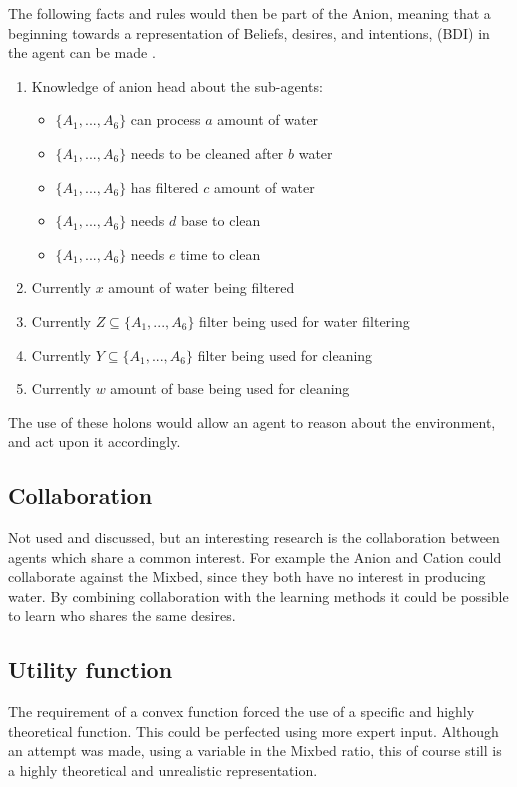 The following facts and rules would then be part of the Anion, meaning that a beginning towards a representation of Beliefs, desires, and intentions, (BDI) in the agent can be made \citep{rao1995bdi}.

\begin{enumerate}
	\item
	Knowledge of anion head about the sub-agents:
	\begin{itemize}
		\item {$\{A_1, ..., A_6\}$ can process $a$ amount of water}
		\item {$\{A_1, ..., A_6\}$ needs to be cleaned after $b$ water}
		\item {$\{A_1, ..., A_6\}$ has filtered $c$ amount of water}
		\item {$\{A_1, ..., A_6\}$ needs $d$ base to clean}
		\item {$\{A_1, ..., A_6\}$ needs $e$ time to clean}
	\end{itemize}
	\item
	Currently $x$ amount of water being filtered 
	\item
	Currently $Z \subseteq \{A_1, ..., A_6\}$ filter being used for water filtering
	\item
	Currently $Y \subseteq \{A_1, ..., A_6\}$ filter being used for cleaning
	\item
	Currently $w$ amount of base being used for cleaning
\end{enumerate}

The use of these holons would allow an agent to reason about the environment, and act upon it accordingly.

\subsection{Collaboration }
Not used and discussed, but an interesting research is the collaboration between agents which share a common interest. For example the Anion and Cation could collaborate against the Mixbed, since they both have no interest in producing water. By combining collaboration with the learning methods it could be possible to learn who shares the same desires.

\subsection{Utility function}
The requirement of a convex function forced the use of a specific and highly theoretical function. This could be perfected using more expert input. Although an attempt was made, using a variable in the Mixbed ratio, this of course still is a highly theoretical and unrealistic representation.

